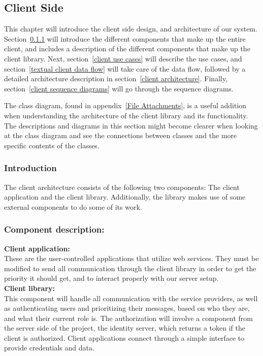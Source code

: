 \subsection{Client Side}\label{client side}

This chapter will introduce the client side design, and architecture of our system. Section~\ref{client introduction} will introduce the different components that make up the entire client, and includes a description of the different components that make up the client library. Next, section~\ref{client use cases} will describe the use cases, and section~\ref{textual client data flow} will take care of the data flow, followed by a detailed architecture description in section~\ref{client architecture}. Finally, section~\ref{client sequence diagrams} will go through the sequence diagrams.
    
    The class diagram, found in appendix~\ref{File Attachments}, is a useful addition when understanding the architecture of the client library and its functionality. The descriptions and diagrams in this section might become clearer when looking at the class diagram and see the connections between classes and the more specific contents of the classes. 
		
    \subsubsection{Introduction}\label{client introduction}
The client architecture consists of the following two components: The client application and the client library. Additionally, the library makes use of some external components to do some of its work.

    \subsubsection{Component description:}\label{Component description}

\indent \indent \textbf{Client application:}\\
	These are the user-controlled applications that utilize web services. They must be modified to send all communication through the client library in order to get the priority it should get, and to interact properly with our server setup. \\

\indent \textbf{Client library:}\\
This component will handle all communication with the service providers, as well as authenticating users and prioritizing their messages, based on who they are, and what their current role is. The authorization will involve a component from the server side of the project, the identity server, which returns a token if the client is authorized. Client applications connect through a simple interface to provide credentials and data.


